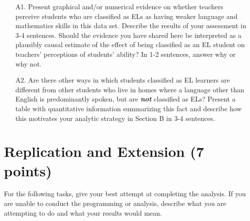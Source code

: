 \documentclass[a4paper, 11pt]{article}
\begin{document}
\begin{enumerate}
	\item[A1.] Present graphical and/or numerical evidence on whether teachers perceive students who are classified as ELs as having weaker language and mathematics skills in this data set. Describe the results of your assessment in 3-4 sentences. Should the evidence you have shared here be interpreted as a plausibly causal estimate of the effect of being classified as an EL student on teachers' perceptions of students' ability? In 1-2 sentences, answer why or why not.
	\item[A2.] Are there other ways in which students classified as EL learners are different from other students who live in homes where a language other than English is predominantly spoken, but are \textbf{\textit{not}} classified as ELs? Present a table with quantitative information summarizing this fact and describe how this motivates your analytic strategy in Section B in 3-4 sentences.

\end{enumerate}

\section{Replication and Extension (7 points)}
For the following tasks, give your best attempt at completing the analysis. If you are unable to conduct the programming or analysis, describe what you are attempting to do and what your results would mean. 
\end{document}

